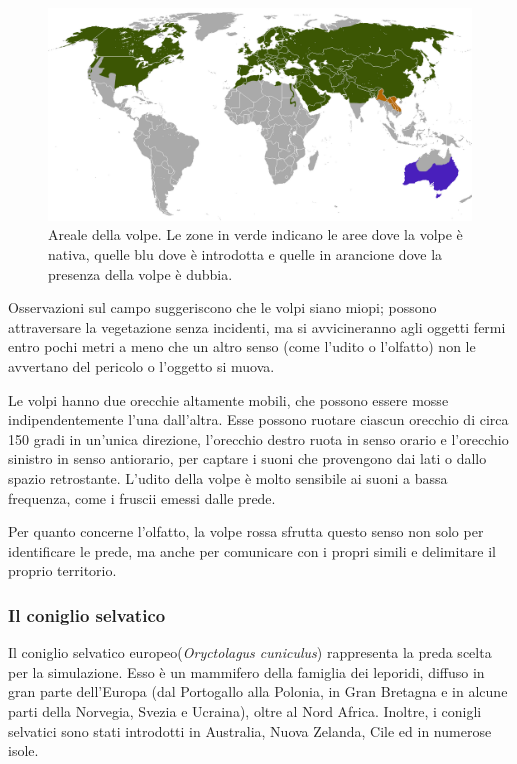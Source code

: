 \documentclass[11pt]{article}
\begin{document}
\begin{figure}[h]
    \centering
    \includegraphics[scale = 0.3]{ArealeDellaVolpe.png}
    \caption{Areale della volpe. Le zone in verde indicano le aree dove la volpe è nativa, quelle blu dove è introdotta e quelle in arancione dove la presenza della volpe è dubbia. }
    \label{figArealeVolpe}
\end{figure}

Osservazioni sul campo\cite{RedFox} suggeriscono che le volpi siano miopi; possono attraversare la vegetazione senza incidenti, ma si avvicineranno agli oggetti fermi entro pochi metri a meno che un altro senso (come l'udito o l'olfatto) non le avvertano del pericolo o l'oggetto si muova. 

Le volpi hanno due orecchie altamente mobili, che possono essere mosse indipendentemente l'una dall'altra. Esse possono ruotare ciascun orecchio di circa 150 gradi in un'unica direzione, l'orecchio destro ruota in senso orario e l'orecchio sinistro in senso antiorario, per captare i suoni che provengono dai lati o dallo spazio retrostante. L'udito della volpe è molto sensibile ai suoni a bassa frequenza, come i fruscii emessi dalle prede. 

Per quanto concerne l'olfatto, la volpe rossa sfrutta questo senso non solo per identificare le prede, ma anche per comunicare con i propri simili e delimitare il proprio territorio.


\subsubsection{Il coniglio selvatico}
\label{coniglio}
Il coniglio selvatico europeo(\emph{Oryctolagus cuniculus}) rappresenta la preda scelta per la simulazione. Esso \cite{WikiConiglio} è un mammifero della famiglia dei leporidi, diffuso in gran parte dell'Europa (dal Portogallo alla Polonia, in Gran Bretagna e in alcune parti della Norvegia, Svezia e Ucraina), oltre al Nord Africa. Inoltre, i conigli selvatici sono stati introdotti in  Australia, Nuova Zelanda, Cile ed in numerose isole. 
\end{document}
